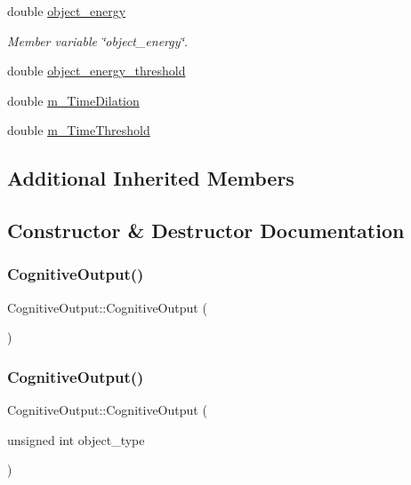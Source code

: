 \begin{DoxyCompactItemize}
double \mbox{\hyperlink{classCognitiveOutput_a2076a7d78fa8b640a2eca9dad691b239}{object\+\_\+energy}}
\begin{DoxyCompactList}\small\item\em Member variable \char`\"{}object\+\_\+energy\char`\"{}. \end{DoxyCompactList}\item 
double \mbox{\hyperlink{classCognitiveOutput_a67a1ee243a825884fc65ee70674d5b15}{object\+\_\+energy\+\_\+threshold}}
\item 
double \mbox{\hyperlink{classCognitiveOutput_a3aa3affaa91c42efda6b8a227c798070}{m\+\_\+\+Time\+Dilation}}
\item 
double \mbox{\hyperlink{classCognitiveOutput_a03ad45b97e6390b030966a50b114c5bf}{m\+\_\+\+Time\+Threshold}}
\end{DoxyCompactItemize}
\subsection*{Additional Inherited Members}


\subsection{Constructor \& Destructor Documentation}
\mbox{\label{classCognitiveOutput_a743042cff5c36a76cd975767358e1bbf}} 
\subsubsection{\texorpdfstring{Cognitive\+Output()}{CognitiveOutput()}\hspace{0.1cm}{\footnotesize\ttfamily [1/4]}}
{\footnotesize\ttfamily Cognitive\+Output\+::\+Cognitive\+Output (\begin{DoxyParamCaption}{ }\end{DoxyParamCaption})\hspace{0.3cm}{\ttfamily [inline]}}

\mbox{\label{classCognitiveOutput_af1fca516a8a90913760e8ac5431f6f70}} 
\subsubsection{\texorpdfstring{Cognitive\+Output()}{CognitiveOutput()}\hspace{0.1cm}{\footnotesize\ttfamily [2/4]}}
{\footnotesize\ttfamily Cognitive\+Output\+::\+Cognitive\+Output (\begin{DoxyParamCaption}\item[{unsigned int}]{object\+\_\+type }\end{DoxyParamCaption})\hspace{0.3cm}{\ttfamily [inline]}}

